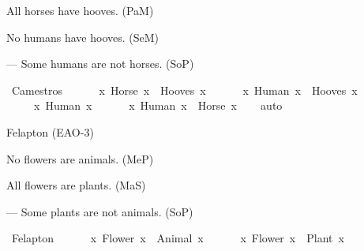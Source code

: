 \begin{isabellebody}
\begin{exercise}[subtitle=Silogizmi]
%
\begin{isamarkuptext}%
All horses have hooves. (PaM)%
\end{isamarkuptext}\isamarkuptrue%
%
\begin{isamarkuptext}%
No humans have hooves. (SeM)%
\end{isamarkuptext}\isamarkuptrue%
%
\begin{isamarkuptext}%
— Some humans are not horses. (SoP)%
\end{isamarkuptext}\isamarkuptrue%
\isamarkupfalse%
\ Camestros{\isacharcolon}{\kern0pt}\ {\isachardoublequoteopen}\isanewline
\ \ \ \ {\isacharparenleft}{\kern0pt}{\isasymforall}\ x{\isachardot}{\kern0pt}\ Horse\ x\ {\isasymlongrightarrow}\ Hooves\ x{\isacharparenright}{\kern0pt}\ {\isasymand}\isanewline
\ \ \ \ {\isacharparenleft}{\kern0pt}{\isasymnexists}\ x{\isachardot}{\kern0pt}\ Human\ x\ {\isasymand}\ Hooves\ x{\isacharparenright}{\kern0pt}\ {\isasymand}\isanewline
\ \ \ \ {\isacharparenleft}{\kern0pt}{\isasymexists}\ x{\isachardot}{\kern0pt}\ Human\ x{\isacharparenright}{\kern0pt}\ {\isasymlongrightarrow}\isanewline
\ \ \ \ {\isacharparenleft}{\kern0pt}{\isasymexists}\ x{\isachardot}{\kern0pt}\ Human\ x\ {\isasymand}\ {\isasymnot}Horse\ x{\isacharparenright}{\kern0pt}{\isachardoublequoteclose}\isanewline
%
\isadelimproof
\ \ %
\endisadelimproof
%
\isatagproof
{}\isamarkupfalse%
\ auto%
\endisatagproof
{\isafoldproof}%
%
\isadelimproof
%
\endisadelimproof
%
\begin{isamarkuptext}%
Felapton (EAO-3)%
\end{isamarkuptext}\isamarkuptrue%
%
\begin{isamarkuptext}%
No flowers are animals. (MeP)%
\end{isamarkuptext}\isamarkuptrue%
%
\begin{isamarkuptext}%
All flowers are plants. (MaS)%
\end{isamarkuptext}\isamarkuptrue%
%
\begin{isamarkuptext}%
— Some plants are not animals. (SoP)%
\end{isamarkuptext}\isamarkuptrue%
\isamarkupfalse%
\ Felapton{\isacharcolon}{\kern0pt}\ {\isachardoublequoteopen}\isanewline
\ \ \ \ {\isacharparenleft}{\kern0pt}{\isasymnexists}\ x{\isachardot}{\kern0pt}\ Flower\ x\ {\isasymand}\ Animal\ x{\isacharparenright}{\kern0pt}\ {\isasymand}\isanewline
\ \ \ \ {\isacharparenleft}{\kern0pt}{\isasymforall}\ x{\isachardot}{\kern0pt}\ Flower\ x\ {\isasymlongrightarrow}\ Plant\ x{\isacharparenright}{\kern0pt}\ {\isasymand}\isanewline

\end{exercise}
\end{isabellebody}

